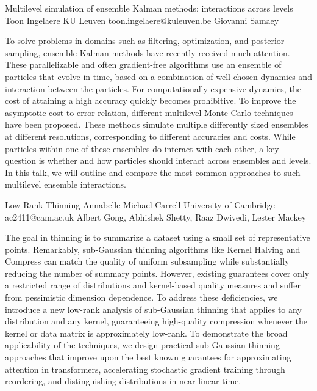 \begin{talk}
  {Multilevel simulation of ensemble Kalman methods: interactions across levels}%
  {Toon Ingelaere}%
  {KU Leuven}%
  {toon.ingelaere@kuleuven.be}%
  {Giovanni Samaey}%
  
    

        To solve problems in domains such as filtering, optimization, and posterior sampling,
        ensemble Kalman methods have recently received much attention. These parallelizable and often gradient-free algorithms use an ensemble of particles that evolve in time, based on a combination of well-chosen dynamics and interaction between the particles. For computationally expensive dynamics, the cost of attaining a high accuracy quickly becomes prohibitive. To improve the asymptotic cost-to-error relation, different multilevel Monte Carlo techniques have been proposed. These methods simulate multiple differently sized ensembles at different resolutions, corresponding to different accuracies and costs. While particles within one of these ensembles do interact with each other, a key question is whether and how particles should interact across ensembles and levels.
        In this talk, we will outline and compare the most common approaches to such multilevel ensemble interactions.

\medskip

\end{talk}

\begin{talk}
  {Low-Rank Thinning}%
  {Annabelle Michael Carrell}%
  {University of Cambridge}%
  {ac2411@cam.ac.uk}%
  {Albert Gong, Abhishek Shetty, Raaz Dwivedi, Lester Mackey}%
  
    
   
The goal in thinning is to summarize a dataset using a small set of representative points. Remarkably, sub-Gaussian thinning algorithms like Kernel Halving and Compress can match the quality of uniform subsampling while substantially reducing the number of summary points. However, existing guarantees cover only a restricted range of distributions and kernel-based quality measures and suffer from pessimistic dimension dependence. To address these deficiencies, we introduce a new low-rank analysis of sub-Gaussian thinning that applies to any distribution and any kernel, guaranteeing high-quality compression whenever the kernel or data matrix is approximately low-rank. To demonstrate the broad applicability of the techniques, we design practical sub-Gaussian thinning approaches that improve upon the best known guarantees for approximating attention in transformers, accelerating stochastic gradient training through reordering, and distinguishing distributions in near-linear time. 

\medskip

\end{talk}

